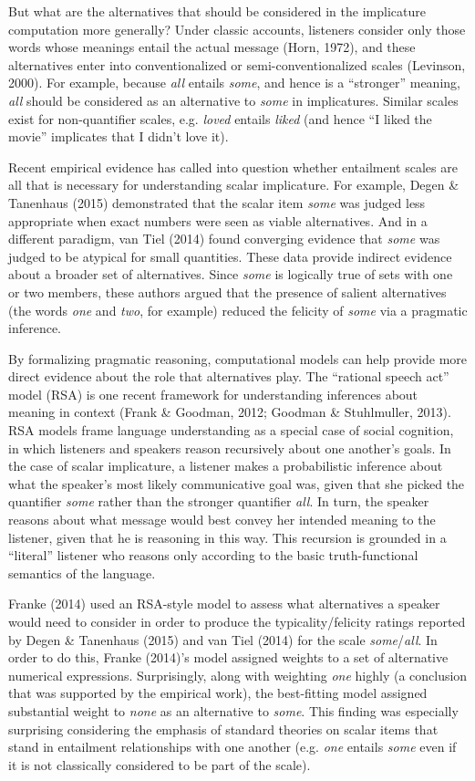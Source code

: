 \documentclass[10pt, letterpaper]{article}
\begin{document}
But what are the alternatives that should be considered in the
implicature computation more generally? Under classic accounts,
listeners consider only those words whose meanings entail the actual
message (Horn, 1972), and these alternatives enter into conventionalized
or semi-conventionalized scales (Levinson, 2000). For example, because
\emph{all} entails \emph{some}, and hence is a ``stronger'' meaning,
\emph{all} should be considered as an alternative to \emph{some} in
implicatures. Similar scales exist for non-quantifier scales, e.g.
\emph{loved} entails \emph{liked} (and hence ``I liked the movie''
implicates that I didn't love it).

Recent empirical evidence has called into question whether entailment
scales are all that is necessary for understanding scalar implicature.
For example, Degen \& Tanenhaus (2015) demonstrated that the scalar item
\emph{some} was judged less appropriate when exact numbers were seen as
viable alternatives. And in a different paradigm, {van Tiel} (2014)
found converging evidence that \emph{some} was judged to be atypical for
small quantities. These data provide indirect evidence about a broader
set of alternatives. Since \emph{some} is logically true of sets with
one or two members, these authors argued that the presence of salient
alternatives (the words \emph{one} and \emph{two}, for example) reduced
the felicity of \emph{some} via a pragmatic inference.

By formalizing pragmatic reasoning, computational models can help
provide more direct evidence about the role that alternatives play. The
``rational speech act'' model (RSA) is one recent framework for
understanding inferences about meaning in context (Frank \& Goodman,
2012; Goodman \& Stuhlmuller, 2013). RSA models frame language
understanding as a special case of social cognition, in which listeners
and speakers reason recursively about one another's goals. In the case
of scalar implicature, a listener makes a probabilistic inference about
what the speaker's most likely communicative goal was, given that she
picked the quantifier \emph{some} rather than the stronger quantifier
\emph{all}. In turn, the speaker reasons about what message would best
convey her intended meaning to the listener, given that he is reasoning
in this way. This recursion is grounded in a ``literal'' listener who
reasons only according to the basic truth-functional semantics of the
language.

Franke (2014) used an RSA-style model to assess what alternatives a
speaker would need to consider in order to produce the
typicality/felicity ratings reported by Degen \& Tanenhaus (2015) and
{van Tiel} (2014) for the scale \emph{some}/\emph{all}. In order to do
this, Franke (2014)'s model assigned weights to a set of alternative
numerical expressions. Surprisingly, along with weighting \emph{one}
highly (a conclusion that was supported by the empirical work), the
best-fitting model assigned substantial weight to \emph{none} as an
alternative to \emph{some}. This finding was especially surprising
considering the emphasis of standard theories on scalar items that stand
in entailment relationships with one another (e.g. \emph{one} entails
\emph{some} even if it is not classically considered to be part of the
scale).
\end{document}

